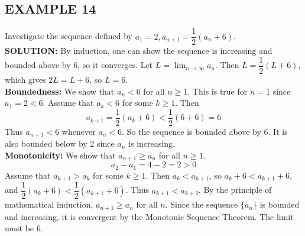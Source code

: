 \documentclass{article}
\theoremstyle{mystyle}
\begin{document}
\subsection*{EXAMPLE 14}
Investigate the sequence defined by \(a_1=2, a_{n+1}=\dfrac{1}{2}(a_n+6)\).\\
\textbf{SOLUTION:} By induction, one can show the sequence is increasing and bounded above by 6, so it converges. Let \(L = \lim_{n\to\infty} a_n\). Then \(L = \dfrac{1}{2}(L+6)\), which gives \(2L=L+6\), so \(L=6\).\\
\textbf{Boundedness:} We show that \(a_n < 6\) for all \(n \ge 1\).
This is true for \(n=1\) since \(a_1 = 2 < 6\). Assume that \(a_k < 6\) for some \(k \ge 1\). Then
\[ a_{k+1} = \dfrac{1}{2}(a_k+6) < \dfrac{1}{2}(6+6) = 6 \]
Thus \(a_{n+1} < 6\) whenever \(a_n < 6\). So the sequence is bounded above by 6. It is also bounded below by 2 since \(a_n\) is increasing.\\
\textbf{Monotonicity:} We show that \(a_{n+1} \ge a_n\) for all \(n \ge 1\).
\[ a_2 - a_1 = 4-2=2 > 0 \]
Assume that \(a_{k+1} > a_k\) for some \(k \ge 1\). Then \(a_k < a_{k+1}\), so \(a_k+6 < a_{k+1}+6\), and \(\dfrac{1}{2}(a_k+6) < \dfrac{1}{2}(a_{k+1}+6)\). Thus \(a_{k+1} < a_{k+2}\). By the principle of mathematical induction, \(a_{n+1} \ge a_n\) for all \(n\).
Since the sequence \(\{a_n\}\) is bounded and increasing, it is convergent by the Monotonic Sequence Theorem. The limit must be 6.
\end{document}
